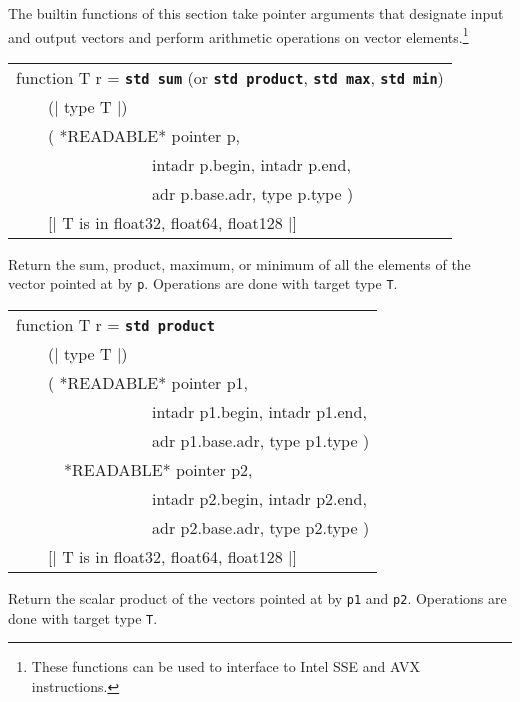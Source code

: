 \documentclass[12pt]{article}
\makeatletter
\newcommand{\TT}[1]{{\tt \bfseries #1}}
\newcommand{\ttstdmkey}[2]{\TT{std #1}\index{#1@{\tt std #1}!#2}}
\newenvironment{indpar}[1][0.3in]%
	{\begin{list}{}%
		     {\setlength{\itemsep}{0in}%
		      \setlength{\topsep}{0in}%
		      \setlength{\parsep}{1ex}%
		      \setlength{\labelwidth}{#1}%
		      \setlength{\leftmargin}{#1}%
		      \addtolength{\leftmargin}{\labelsep}}%
	 \item}%
	{\end{list}}
\makeatother
\begin{document}
The builtin functions of this section take pointer arguments that designate
input and output vectors and perform arithmetic operations on vector
elements.\footnote{These functions can be used to interface to
Intel SSE and AVX instructions.}

\begin{indpar}

{\tt\begin{tabular}{@{}l}
function T r = \ttstdmkey{sum}{of vector} (or \ttstdmkey{product}{of vector},
                                              \ttstdmkey{max}{of vector},
                                              \ttstdmkey{min}{of vector}) \\
~~~~(| type T |) \\
~~~~( *READABLE* pointer p, \\
~~~~~~~~~~~~~~~~~intadr p.begin, intadr p.end, \\
~~~~~~~~~~~~~~~~~adr p.base.adr, type p.type ) \\
~~~~[| T is in { float32, float64, float128 } |] \\
\end{tabular}}

\begin{indpar}
Return the sum, product, maximum, or minimum of all the elements of the vector
pointed at by {\tt p}.  Operations are done with target type {\tt T}.
\end{indpar}

{\tt\begin{tabular}{@{}l}
function T r = \ttstdmkey{product}{of vectors} \\
~~~~(| type T |) \\
~~~~( *READABLE* pointer p1, \\
~~~~~~~~~~~~~~~~~intadr p1.begin, intadr p1.end, \\
~~~~~~~~~~~~~~~~~adr p1.base.adr, type p1.type ) \\
~~~~~~*READABLE* pointer p2, \\
~~~~~~~~~~~~~~~~~intadr p2.begin, intadr p2.end, \\
~~~~~~~~~~~~~~~~~adr p2.base.adr, type p2.type ) \\
~~~~[| T is in { float32, float64, float128 } |] \\
\end{tabular}}

\begin{indpar}
Return the scalar product of the vectors pointed at by {\tt p1} and
{\tt p2}.  Operations are done with target type {\tt T}.
\end{indpar}

\end{indpar}
\end{document}
